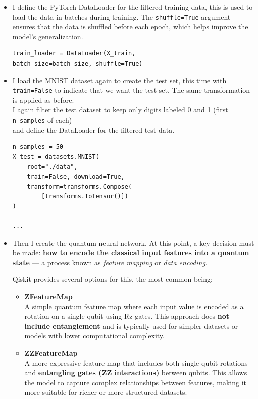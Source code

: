 \documentclass[conference]{IEEEtran}
\begin{document}
\begin{itemize}
    \item I define the PyTorch DataLoader \cite{DataLoader} for the filtered training data, this is used to load the data in batches during training. The \texttt{shuffle=True} argument ensures that the data is shuffled before each epoch, which helps improve the model's generalization.
{\raggedright
\small
\begin{verbatim}
train_loader = DataLoader(X_train, 
batch_size=batch_size, shuffle=True)
\end{verbatim}
}
        
    \item I load the MNIST dataset again to create the test set, this time with \texttt{train=False} to indicate that we want the test set. The same transformation is applied as before.\\
        I again filter the test dataset to keep only digits labeled 0 and 1 (first \texttt{n\_samples} of each)\\ and define the DataLoader for the filtered test data.
        
{\small
\begin{verbatim}
n_samples = 50
X_test = datasets.MNIST(
    root="./data", 
    train=False, download=True,
    transform=transforms.Compose(
        [transforms.ToTensor()])
)

...
\end{verbatim}
}

    \item Then I create the quantum neural network. At this point, a key decision must be made:  
        \textbf{how to encode the classical input features into a quantum state} — a process known as \textit{feature mapping} or \textit{data encoding}.
        
        Qiskit provides several options for this, the most common being:
        

        \begin{itemize}
            \item \textbf{ZFeatureMap \cite{qiskit_zfeaturemap}} \\
            A simple quantum feature map where each input value is encoded as a rotation on a single qubit using Rz gates. This approach does \textbf{not include entanglement} and is typically used for simpler datasets or models with lower computational complexity.
        
            \item \textbf{ZZFeatureMap \cite{qiskit_zzfeaturemap}} \\
            A more expressive feature map that includes both single-qubit rotations and \textbf{entangling gates (ZZ interactions)} between qubits. This allows the model to capture complex relationships between features, making it more suitable for richer or more structured datasets.
        \end{itemize}
        

\end{itemize}
\end{document}
